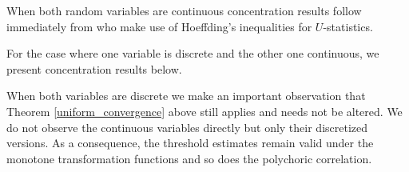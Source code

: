 \begin{description}[labelwidth=4em, leftmargin =\dimexpr\labelwidth+\labelsep\relax, font=\mdseries]
    \item[\textit{Case I}:] When both random variables are continuous concentration results follow immediately from \citet{Liu12} who make use of Hoeffding's inequalities for $U$-statistics.
    \item[\textit{Case II}:] For the case where one variable is discrete and the other one continuous, we present concentration results below.
    \item[\textit{Case III}:] When both variables are discrete we make an important observation that Theorem \ref{uniform_convergence} above still applies and needs not be altered. We do not observe the continuous variables directly but only their discretized versions. As a consequence, the threshold estimates remain valid under the monotone transformation functions and so does the polychoric correlation.
\end{description}

